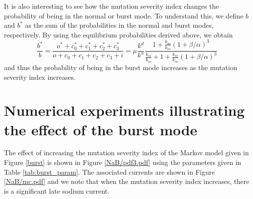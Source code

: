 It is also interesting to see how the mutation severity index changes the
probability of being in the normal or burst mode. To understand
this, we define $b$ and $b^{\ast}$ as the sum of the probabilities in the
normal and burst modes, respectively. By using the equilibrium probabilities
derived above, we obtain
\[
\frac{b^{\ast}}{b}=\frac{o^{\ast}+c_{0}^{\ast}+c_{1}^{\ast}+c_{2}^{\ast}%
+c_{3}^{\ast}}{o+c_{0}+c_{1}+c_{2}+c_{3}+i}=\mu\frac{k^{d}}{k^{u}}%
\frac{1+\frac{k_{oc}}{k_{co}}\left(  1+\beta/\alpha\right)  ^{3}}%
{\frac{k_{oi}}{k_{io}}+1+\frac{k_{oc}}{k_{co}}\left(  1+\beta/\alpha\right)
^{3}}%
\]
and thus the probability of being in the burst mode increases as the mutation
severity index increases.

\bigskip

\section[Numerical experiments; burst mode]{Numerical experiments illustrating the effect of the burst mode}



The effect of increasing the mutation severity index of the Markov model given in Figure \ref{burst} is shown in
 Figure \ref{NaB/pdf3.pdf} using the parameters given in Table \ref{tab:burst_param}.
 The associated currents are shown in Figure
 \ref{NaB/mc.pdf} and we note that when the mutation severity index increases, there is a significant late sodium current.
 

